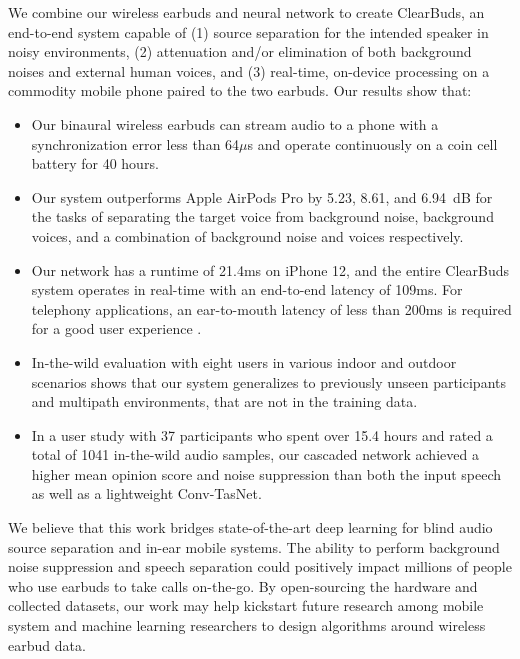 \documentclass [11pt, proquest] {uwthesis}[2020/02/24]
\newcommand{\squishlist}{\begin{itemize}[itemsep=1pt,parsep=2pt,topsep=3pt,partopsep=0pt,leftmargin=0em, itemindent=1em,labelwidth=1em,labelsep=0.5em]}
\newcommand{\squishend}{\end{itemize}}
\begin{document}
We combine our wireless earbuds and neural network to create ClearBuds, an end-to-end system capable of (1) source separation for the intended speaker in noisy environments, (2) attenuation and/or elimination of both background noises and external human voices, and (3) real-time, on-device processing on a commodity mobile phone paired to the  two earbuds.  Our results show that:
\squishlist
    \item Our binaural wireless earbuds  can stream audio to a phone with a synchronization error less than 64$\mu$s and operate  continuously on a coin cell battery for 40 hours.
    \item Our system outperforms Apple AirPods Pro by 5.23, 8.61, and 6.94~dB  for the tasks of  separating the target voice from background noise, background voices, and a combination of background noise and voices respectively.
    \item Our network has a runtime of 21.4ms on iPhone 12, and the entire ClearBuds system operates in real-time with an end-to-end  latency of 109ms.  For telephony applications, an ear-to-mouth latency of less than 200ms is required for a good user experience \cite{g.114}.
    \item In-the-wild evaluation with eight users in various indoor and outdoor scenarios  shows that our system  generalizes to previously unseen participants and multipath environments,  that are not in the training data.  
    \item In a user study with 37  participants who spent over 15.4  hours and rated a total of 1041  in-the-wild  audio samples, our cascaded network achieved a higher mean opinion score and noise suppression  than both the input speech as well as a  lightweight Conv-TasNet. 
    
    
\squishend




We believe that this work bridges state-of-the-art deep  learning for blind audio source separation and in-ear mobile systems. The ability to perform background noise suppression and   speech  separation could positively   impact  millions of people who use earbuds to take calls on-the-go. By open-sourcing the hardware  and collected datasets, our work may  help kickstart future research among mobile system and machine learning researchers to design  algorithms around wireless earbud data.
\end{document}
